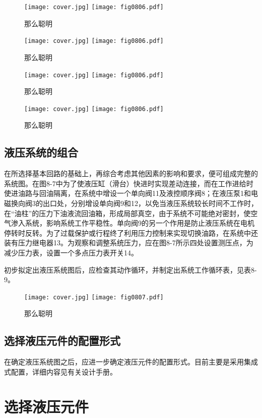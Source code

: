 \begin{figure}
\centering
\ifOpenSource
\texttt{[image: cover.jpg]}
\else
\texttt{[image: fig0806.pdf]}
\fi
\caption{那么聪明}
\label{fig:fig0806}
\end{figure}
\begin{figure}
\centering
\ifOpenSource
\texttt{[image: cover.jpg]}
\else
\texttt{[image: fig0806.pdf]}
\fi
\caption{那么聪明}
\label{fig:fig0806}
\end{figure}
\begin{figure}
\centering
\ifOpenSource
\texttt{[image: cover.jpg]}
\else
\texttt{[image: fig0806.pdf]}
\fi
\caption{那么聪明}
\label{fig:fig0806}
\end{figure}
\begin{figure}
\centering
\ifOpenSource
\texttt{[image: cover.jpg]}
\else
\texttt{[image: fig0806.pdf]}
\fi
\caption{那么聪明}
\label{fig:fig0806}
\end{figure}
\subsection{液压系统的组合}
在所选择基本回路的基础上，再综合考虑其他因素的影响和要求，便可组成完整的系统图。在图8-7中为了使液压缸（滑台）快进时实现差动连接，而在工作进给时使进油路与回油隔离，在系统中增设一个单向阀11及液控顺序阀8；在液压泵1和电磁换向阀3的出口处，分别增设单向阀9和12，以免当液压系统较长时间不工作时，在“油柱”的压力下油液流回油箱，形成局部真空，由于系统不可能绝对密封，使空气渗入系统，影响系统工作平稳性。单向阀9的另一个作用是防止液压系统在电机停转时反转。为了过载保护或行程终了利用压力控制来实现切换油路，在系统中还装有压力继电器13。为观察和调整系统压力，应在图8-7所示四处设置测压点，为减少压力表，设置一个多点压力表开关14。

初步拟定出液压系统图后，应检查其动作循环，并制定出系统工作循环表，见表8-9。
\begin{figure}
\centering
\ifOpenSource
\texttt{[image: cover.jpg]}
\else
\texttt{[image: fig0807.pdf]}
\fi
\caption{那么聪明}
\label{fig:fig0807}
\end{figure}
\subsection{选择液压元件的配置形式}
在确定液压系统图之后，应进一步确定液压元件的配置形式。目前主要是采用集成式配置，详细内容见有关设计手册。
\section{选择液压元件}
